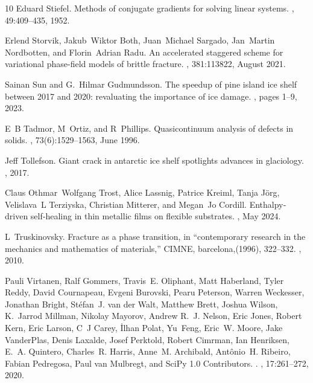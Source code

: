 \documentclass[10pt]{article}
\begin{document}
\begin{thebibliography}{10}
    Eduard Stiefel.
    \newblock Methods of conjugate gradients for solving linear systems.
    , 49:409--435, 1952.

    Erlend Storvik, Jakub~Wiktor Both, Juan~Michael Sargado, Jan~Martin Nordbotten, and Florin~Adrian Radu.
    \newblock An accelerated staggered scheme for variational phase-field models of brittle fracture.
    , 381:113822, August 2021.

    Sainan Sun and G.~Hilmar Gudmundsson.
    \newblock The speedup of pine island ice shelf between 2017 and 2020: revaluating the importance of ice damage.
    , pages 1--9, 2023.

    E~B Tadmor, M~Ortiz, and R~Phillips.
    \newblock Quasicontinuum analysis of defects in solids.
    , 73(6):1529--1563, June 1996.

    Jeff Tollefson.
    \newblock Giant crack in antarctic ice shelf spotlights advances in glaciology.
    , 2017.

    Claus Othmar~Wolfgang Trost, Alice Lassnig, Patrice Kreiml, Tanja J{\"o}rg, Velislava~L Terziyska, Christian Mitterer, and Megan~Jo Cordill.
    \newblock Enthalpy‐driven self‐healing in thin metallic films on flexible substrates.
    , May 2024.

    L~Truskinovsky.
    \newblock Fracture as a phase transition, in ``contemporary research in the mechanics and mathematics of materials,'' {CIMNE}, barcelona,(1996), 322--332.
    , 2010.

    Pauli Virtanen, Ralf Gommers, Travis~E. Oliphant, Matt Haberland, Tyler Reddy, David Cournapeau, Evgeni Burovski, Pearu Peterson, Warren Weckesser, Jonathan Bright, St{\'e}fan~J. {van der Walt}, Matthew Brett, Joshua Wilson, K.~Jarrod Millman, Nikolay Mayorov, Andrew R.~J. Nelson, Eric Jones, Robert Kern, Eric Larson, C~J Carey, {\.I}lhan Polat, Yu~Feng, Eric~W. Moore, Jake {VanderPlas}, Denis Laxalde, Josef Perktold, Robert Cimrman, Ian Henriksen, E.~A. Quintero, Charles~R. Harris, Anne~M. Archibald, Ant{\^o}nio~H. Ribeiro, Fabian Pedregosa, Paul {van Mulbregt}, and {SciPy 1.0 Contributors}.
    .
    , 17:261--272, 2020.


\end{thebibliography}
\end{document}
